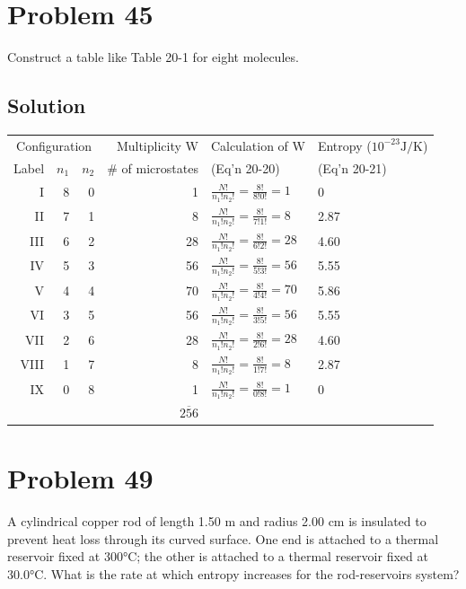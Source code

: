\documentclass[12pt]{article}
\begin{document}
    \pagebreak
    \section{Problem 45}
        Construct a table like Table 20-1 for eight molecules.

        \subsection{Solution}
        {\small \begin{tabular}{ r r r r l l }
            \multicolumn{3}{c}{Configuration}   & Multiplicity W    & Calculation of W  & Entropy ($10^{-23} \unit{\joule/\kelvin}$)\\
            Label   &   $n_1$   &   $n_2$       & \# of microstates & (Eq'n 20-20)      & (Eq'n 20-21)\\
            \hline
            I   &   8   &   0   &   1   &   $\frac{N!}{n_1! n_2!} = \frac{8!}{8! 0!} = 1$   &   0
            \\
            II  &   7   &   1   &   8   &   $\frac{N!}{n_1! n_2!} = \frac{8!}{7! 1!} = 8$   &   2.87
            \\
            III &   6   &   2   &   28  &   $\frac{N!}{n_1! n_2!} = \frac{8!}{6! 2!} = 28$  &   4.60
            \\
            IV  &   5   &   3   &   56  &   $\frac{N!}{n_1! n_2!} = \frac{8!}{5! 3!} = 56$  &   5.55
            \\
            V   &   4   &   4   &   70  &   $\frac{N!}{n_1! n_2!} = \frac{8!}{4! 4!} = 70$  &   5.86
            \\
            VI  &   3   &   5   &   56  &   $\frac{N!}{n_1! n_2!} = \frac{8!}{3! 5!} = 56$  &   5.55
            \\
            VII &   2   &   6   &   28  &   $\frac{N!}{n_1! n_2!} = \frac{8!}{2! 6!} = 28$  &   4.60
            \\
            VIII&   1   &   7   &   8   &   $\frac{N!}{n_1! n_2!} = \frac{8!}{1! 7!} = 8$   &   2.87
            \\
            IX  &   0   &   8   &   1   &   $\frac{N!}{n_1! n_2!} = \frac{8!}{0! 8!} = 1$   &   0
            \\
            &&& $\overline{256}$
        \end{tabular}}

    \pagebreak
    \section{Problem 49}
        A cylindrical copper rod of length 1.50 m and radius 2.00 cm is insulated to prevent heat loss through its curved surface. 
        One end is attached to a thermal reservoir fixed at 300\unit{\celsius}; the other is attached to a thermal reservoir fixed at 30.0\unit{\celsius}. 
        What is the rate at which entropy increases for the rod-reservoirs system?
\end{document}
